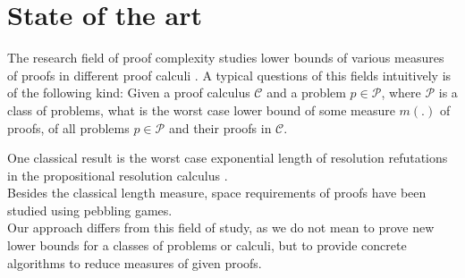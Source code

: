 \section{State of the art}

The research field of proof complexity studies lower bounds of various measures of proofs in different proof calculi \cite{Arora2009}. A typical questions of this fields intuitively is of the following kind: Given a proof calculus $\mathcal{C}$ and a problem $p \in \mathcal{P}$, where $\mathcal{P}$ is a class of problems, what is the worst case lower bound of some measure $m(.)$ of proofs, of all problems $p \in \mathcal{P}$ and their proofs in $\mathcal{C}$. %

One classical result is the worst case exponential length of resolution refutations in the propositional resolution calculus \cite{Arora2009}.\\
Besides the classical length measure, space requirements of proofs have been studied \cite{Sethi1975,Nordstrom2013,Hopcroft1977,Esteban2001,Ben-Sasson2002} using pebbling games.\\
Our approach differs from this field of study, as we do not mean to prove new lower bounds for a classes of problems or calculi, but to provide concrete algorithms to reduce measures of given proofs.

